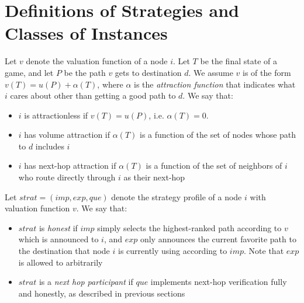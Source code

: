\documentclass[12pt]{article}
\newtheorem{definition}{Definition}
\begin{document}
\section{Definitions of Strategies and Classes of Instances}
  Let $v$ denote the valuation function of a node $i$.
  Let $T$ be the final state of a game, and let $P$ be the path
  $v$ gets to destination $d$. We assume $v$ is of the form
  $v(T) = u(P) + \alpha(T)$, where $\alpha$ is the 
  \emph{attraction function} that indicates what $i$ cares about
  other than getting a good path to $d$.
  We say that:
  \begin{itemize}
    \item $i$ is attractionless if $v(T) = u(P)$, i.e. $\alpha(T) = 0$.
    \item $i$ has volume attraction if $\alpha(T)$ is a function
      of the set of nodes whose path to $d$ includes $i$
    \item $i$ has next-hop attraction if $\alpha(T)$ is a function
      of the set of neighbors of $i$ who route directly through $i$
      as their next-hop
  \end{itemize}

  Let $strat = (imp, exp, que)$ denote the strategy profile of a node
  $i$ with valuation function $v$.
  We say that:
  \begin{itemize}
    \item $strat$ is \emph{honest} if $imp$ simply selects the highest-ranked
      path according to $v$ which is announced to $i$, and
      $exp$ only announces the current favorite
      path to the destination that node $i$ is currently using according to $imp$.
      Note that $exp$ is allowed to arbitrarily 
    \item $strat$ is a \emph{next hop participant} if $que$ implements
      next-hop verification fully and honestly, as described in
      previous sections
  \end{itemize}

\end{document}
